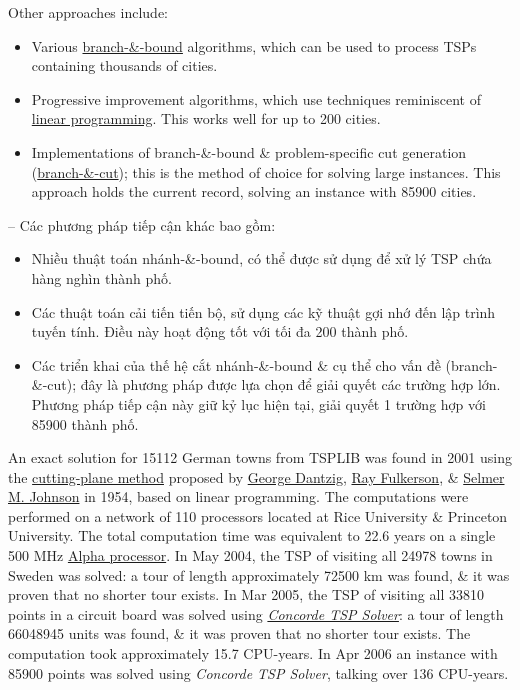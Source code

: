 \documentclass{article}
\begin{document}
Other approaches include:
\begin{itemize}
    \item Various \href{https://en.wikipedia.org/wiki/Branch_and_bound}{branch-\&-bound} algorithms, which can be used to process TSPs containing thousands of cities.
    \item Progressive improvement algorithms, which use techniques reminiscent of \href{https://en.wikipedia.org/wiki/Linear_programming}{linear programming}. This works well for up to 200 cities.
    \item Implementations of branch-\&-bound \& problem-specific cut generation (\href{https://en.wikipedia.org/wiki/Branch_and_cut}{branch-\&-cut}); this is the method of choice for solving large instances. This approach holds the current record, solving an instance with 85900 cities.
\end{itemize}
-- Các phương pháp tiếp cận khác bao gồm:
\begin{itemize}
    \item Nhiều thuật toán nhánh-\&-bound, có thể được sử dụng để xử lý TSP chứa hàng nghìn thành phố.
    \item Các thuật toán cải tiến tiến bộ, sử dụng các kỹ thuật gợi nhớ đến lập trình tuyến tính. Điều này hoạt động tốt với tối đa 200 thành phố.
    \item Các triển khai của thế hệ cắt nhánh-\&-bound \& cụ thể cho vấn đề (branch-\&-cut); đây là phương pháp được lựa chọn để giải quyết các trường hợp lớn. Phương pháp tiếp cận này giữ kỷ lục hiện tại, giải quyết 1 trường hợp với 85900 thành phố.
\end{itemize}
An exact solution for 15112 German towns from TSPLIB was found in 2001 using the \href{https://en.wikipedia.org/wiki/Cutting-plane_method}{cutting-plane method} proposed by \href{https://en.wikipedia.org/wiki/George_Dantzig}{\sc George Dantzig}, \href{https://en.wikipedia.org/wiki/D._R._Fulkerson}{\sc Ray Fulkerson}, \& \href{https://en.wikipedia.org/wiki/Selmer_M._Johnson}{\sc Selmer M. Johnson} in 1954, based on linear programming. The computations were performed on a network of 110 processors located at Rice University \& Princeton University. The total computation time was equivalent to 22.6 years on a single 500 MHz \href{https://en.wikipedia.org/wiki/Alpha_processor}{Alpha processor}. In May 2004, the TSP of visiting all 24978 towns in Sweden was solved: a tour of length approximately 72500 km was found, \& it was proven that no shorter tour exists. In Mar 2005, the TSP of visiting all 33810 points in a circuit board was solved using \href{https://en.wikipedia.org/wiki/Concorde_TSP_Solver}{\it Concorde TSP Solver}: a tour of length 66048945 units was found, \& it was proven that no shorter tour exists. The computation took approximately 15.7 CPU-years. In Apr 2006 an instance with 85900 points was solved using {\it Concorde TSP Solver}, talking over 136 CPU-years.
\end{document}
